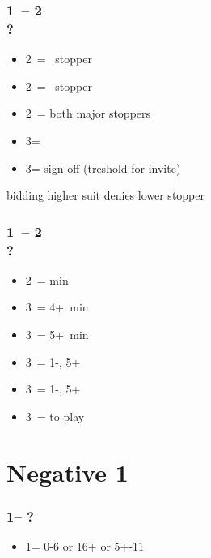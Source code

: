 \documentclass[12pt, a4paper]{report}
\begin{document}
{{{            \subsubsection*{1\diams\ -- 2\diams \\ ?}
            \begin{itemize}
                \item 2\hearts\ = \hearts\ stopper
                \item 2\spades\ = \spades\ stopper
                \item 2\nt\ = both major stoppers
                \item 3\clubs = \nat
                \item 3\diams = sign off (treshold for invite)
            \end{itemize}

            bidding higher suit denies lower stopper

            \subsubsection*{1\diams\ -- 2\spades \\ ?}
            \begin{itemize}
                \item 2\nt\ = \bal min
                \item 3\clubs\ = 4+\clubs\ min
                \item 3\diams\ = 5+\diams\ min
                \item 3\hearts\ = 1-\hearts, 5+\diams\ \gf
                \item 3\spades\ = 1-\spades, 5+\diams\ \gf
                \item 3\nt\ = to play
            \end{itemize}
        }

        \section*{\colorbox{blue!30}{Negative 1\diams}}
         {

            \subsubsection*{1\clubs -- ?}
            \begin{itemize}
                \item 1\diams = 0-6 or 16+ \bal or 5+-11
            \end{itemize}

}}}
\end{document}
